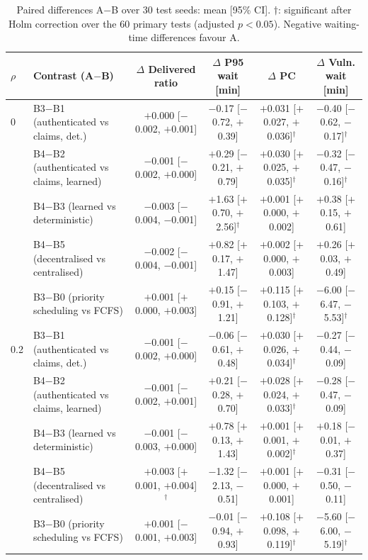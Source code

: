 \begin{table}[!t]
\caption{Paired differences A$-$B over 30 test seeds: mean [95\% CI]. $\dagger$: significant after Holm correction over the 60 primary tests (adjusted $p<0.05$). Negative waiting-time differences favour A.}
\label{tabcon}
\centering\footnotesize
\begin{tabular}{llcccc}
\toprule
$\rho$ & Contrast (A$-$B) & $\Delta$ Delivered ratio & $\Delta$ P95 wait [min] & $\Delta$ PC & $\Delta$ Vuln. wait [min] \\
\midrule
0 & B3$-$B1 (authenticated vs claims, det.) & $+$0.000 [$-$0.002, $+$0.001] & $-$0.17 [$-$0.72, $+$0.39] & $+$0.031 [$+$0.027, $+$0.036]$^\dagger$ & $-$0.40 [$-$0.62, $-$0.17]$^\dagger$ \\
 & B4$-$B2 (authenticated vs claims, learned) & $-$0.001 [$-$0.002, $+$0.000] & $+$0.29 [$-$0.21, $+$0.79] & $+$0.030 [$+$0.025, $+$0.035]$^\dagger$ & $-$0.32 [$-$0.47, $-$0.16]$^\dagger$ \\
 & B4$-$B3 (learned vs deterministic) & $-$0.003 [$-$0.004, $-$0.001] & $+$1.63 [$+$0.70, $+$2.56]$^\dagger$ & $+$0.001 [$+$0.000, $+$0.002] & $+$0.38 [$+$0.15, $+$0.61] \\
 & B4$-$B5 (decentralised vs centralised) & $-$0.002 [$-$0.004, $-$0.001] & $+$0.82 [$+$0.17, $+$1.47] & $+$0.002 [$+$0.000, $+$0.003] & $+$0.26 [$+$0.03, $+$0.49] \\
 & B3$-$B0 (priority scheduling vs FCFS) & $+$0.001 [$+$0.000, $+$0.003] & $+$0.15 [$-$0.91, $+$1.21] & $+$0.115 [$+$0.103, $+$0.128]$^\dagger$ & $-$6.00 [$-$6.47, $-$5.53]$^\dagger$ \\
\midrule
0.2 & B3$-$B1 (authenticated vs claims, det.) & $-$0.001 [$-$0.002, $+$0.000] & $-$0.06 [$-$0.61, $+$0.48] & $+$0.030 [$+$0.026, $+$0.034]$^\dagger$ & $-$0.27 [$-$0.44, $-$0.09] \\
 & B4$-$B2 (authenticated vs claims, learned) & $-$0.001 [$-$0.002, $+$0.001] & $+$0.21 [$-$0.28, $+$0.70] & $+$0.028 [$+$0.024, $+$0.033]$^\dagger$ & $-$0.28 [$-$0.47, $-$0.09] \\
 & B4$-$B3 (learned vs deterministic) & $-$0.001 [$-$0.003, $+$0.000] & $+$0.78 [$+$0.13, $+$1.43] & $+$0.001 [$+$0.001, $+$0.002]$^\dagger$ & $+$0.18 [$-$0.01, $+$0.37] \\
 & B4$-$B5 (decentralised vs centralised) & $+$0.003 [$+$0.001, $+$0.004]$^\dagger$ & $-$1.32 [$-$2.13, $-$0.51] & $+$0.001 [$+$0.000, $+$0.001] & $-$0.31 [$-$0.50, $-$0.11] \\
 & B3$-$B0 (priority scheduling vs FCFS) & $+$0.001 [$-$0.001, $+$0.003] & $-$0.01 [$-$0.94, $+$0.93] & $+$0.108 [$+$0.098, $+$0.119]$^\dagger$ & $-$5.60 [$-$6.00, $-$5.19]$^\dagger$ \\

\end{tabular}
\end{table}
